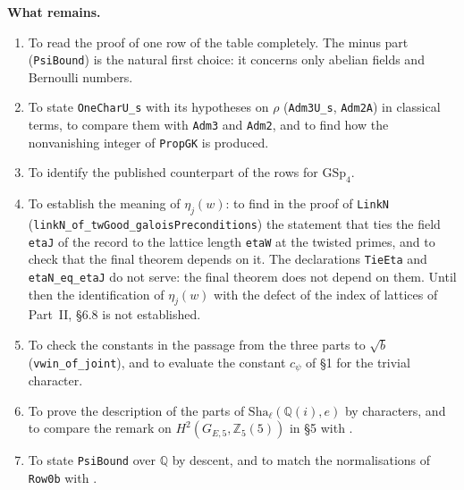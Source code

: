 \documentclass[11pt,letterpaper]{article}
\newcommand{\Z}{\mathbb Z}\newcommand{\Q}{\mathbb Q}\newcommand{\C}{\mathbb C}
\begin{document}
\textbf{What remains.}
\begin{enumerate}[label=\textup{(\roman*)},leftmargin=2.4em]
\item To read the proof of one row of the table completely. The minus part (\texttt{PsiBound}) is the natural
first choice: it concerns only abelian fields and Bernoulli numbers.
\item To state \texttt{OneCharU\_s} with its hypotheses on $\rho$ (\texttt{Adm3U\_s}, \texttt{Adm2A}) in
classical terms, to compare them with \texttt{Adm3} and \texttt{Adm2}, and to find how the nonvanishing
integer of \texttt{PropGK} is produced.
\item To identify the published counterpart of the rows for $\mathrm{GSp}_4$.
\item To establish the meaning of $\eta_j(w)$: to find in the proof of \texttt{LinkN}
(\texttt{linkN\_of\_twGood\_}\allowbreak\texttt{galoisPreconditions}) the statement that ties the field
\texttt{etaJ} of the record to the lattice length \texttt{etaW} at the twisted primes, and to check that
the final theorem depends on it. The declarations \texttt{TieEta} and \texttt{etaN\_eq\_etaJ} do not serve:
the final theorem does not depend on them. Until then the identification of $\eta_j(w)$ with the defect of
the index of lattices of Part~II, \S6.8 is not established.
\item To check the constants in the passage from the three parts to $\sqrt b$ (\texttt{vwin\_of\_joint}),
and to evaluate the constant $c_\psi$ of \S1 for the trivial character.
\item To prove the description of the parts of $\mathrm{Sha}_\ell(\Q(i),e)$ by characters, and to compare
the remark on $H^2(G_{E,5},\Z_5(5))$ in \S5 with \cite{MW84}.
\item To state \texttt{PsiBound} over $\Q$ by descent, and to match the normalisations of \texttt{Row0b} with
\cite{CH13,Car12,Car14}.
\end{enumerate}
\end{document}
